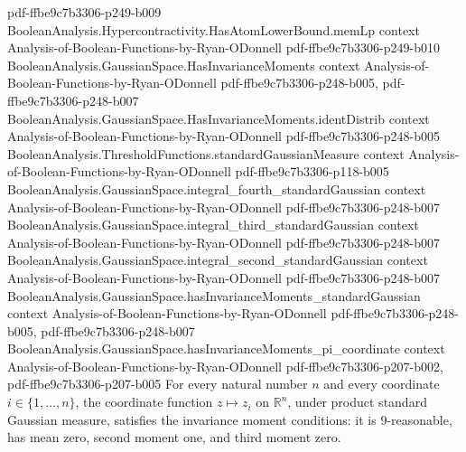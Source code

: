 \begin{lemma}
  {pdf-ffbe9c7b3306-p249-b009}
\proofstep
  {BooleanAnalysis.Hypercontractivity.HasAtomLowerBound.memLp}
  {context}
  {Analysis-of-Boolean-Functions-by-Ryan-ODonnell}
  {pdf-ffbe9c7b3306-p249-b010}
\proofstep
  {BooleanAnalysis.GaussianSpace.HasInvarianceMoments}
  {context}
  {Analysis-of-Boolean-Functions-by-Ryan-ODonnell}
  {pdf-ffbe9c7b3306-p248-b005,
    pdf-ffbe9c7b3306-p248-b007}
\proofstep
  {BooleanAnalysis.GaussianSpace.HasInvarianceMoments.identDistrib}
  {context}
  {Analysis-of-Boolean-Functions-by-Ryan-ODonnell}
  {pdf-ffbe9c7b3306-p248-b005}
\proofstep
  {BooleanAnalysis.ThresholdFunctions.standardGaussianMeasure}
  {context}
  {Analysis-of-Boolean-Functions-by-Ryan-ODonnell}
  {pdf-ffbe9c7b3306-p118-b005}
\proofstep
  {BooleanAnalysis.GaussianSpace.integral_fourth_standardGaussian}
  {context}
  {Analysis-of-Boolean-Functions-by-Ryan-ODonnell}
  {pdf-ffbe9c7b3306-p248-b007}
\proofstep
  {BooleanAnalysis.GaussianSpace.integral_third_standardGaussian}
  {context}
  {Analysis-of-Boolean-Functions-by-Ryan-ODonnell}
  {pdf-ffbe9c7b3306-p248-b007}
\proofstep
  {BooleanAnalysis.GaussianSpace.integral_second_standardGaussian}
  {context}
  {Analysis-of-Boolean-Functions-by-Ryan-ODonnell}
  {pdf-ffbe9c7b3306-p248-b007}
\proofstep
  {BooleanAnalysis.GaussianSpace.hasInvarianceMoments_standardGaussian}
  {context}
  {Analysis-of-Boolean-Functions-by-Ryan-ODonnell}
  {pdf-ffbe9c7b3306-p248-b005,
    pdf-ffbe9c7b3306-p248-b007}
\proofstep
  {BooleanAnalysis.GaussianSpace.hasInvarianceMoments_pi_coordinate}
  {context}
  {Analysis-of-Boolean-Functions-by-Ryan-ODonnell}
  {pdf-ffbe9c7b3306-p207-b002,
    pdf-ffbe9c7b3306-p207-b005}
For every natural number $n$ and every coordinate $i\in\{1,\ldots,n\}$, the coordinate
function $z\mapsto z_i$ on $\mathbb R^n$, under product standard Gaussian measure,
satisfies the invariance moment conditions: it is $9$-reasonable, has mean zero, second
moment one, and third moment zero.
\end{lemma}

